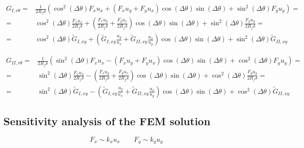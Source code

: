 \documentclass[a4paper]{jpconf}
\begin{document}
\begin{equation}
\begin{split}
G_{I,r\theta} =&\frac{1}{2R_{f}\delta}\left(\cos^{2}\left(\Delta\theta\right) F_{x}u_{x}+\left(F_{x}u_{y}+F_{y}u_{x}\right)\cos\left(\Delta\theta\right)\sin\left(\Delta\theta\right)+\sin^{2}\left(\Delta\theta\right)F_{y}u_{y}\right)=\\
=&\cos^{2}\left(\Delta\theta\right)\frac{ F_{x}u_{x}}{2R_{f}\delta}+\left(\frac{F_{x}u_{y}}{2R_{f}\delta}+\frac{F_{y}u_{x}}{2R_{f}\delta}\right)\cos\left(\Delta\theta\right)\sin\left(\Delta\theta\right)+\sin^{2}\left(\Delta\theta\right)\frac{F_{y}u_{y}}{2R_{f}\delta}=\\
=&\cos^{2}\left(\Delta\theta\right)\widetilde{G}_{I,xy}+\left(\widetilde{G}_{I,xy}\frac{u_{y}}{u_{x}}+\widetilde{G}_{II,xy}\frac{u_{x}}{u_{y}}\right)\cos\left(\Delta\theta\right)\sin\left(\Delta\theta\right)+\sin^{2}\left(\Delta\theta\right)\widetilde{G}_{II,xy}
\end{split}
\end{equation}

\begin{equation}
\begin{split}
G_{II,r\theta} =&\frac{1}{2R_{f}\delta}\left(\sin^{2}\left(\Delta\theta\right) F_{x}u_{x}-\left(F_{x}u_{y}+F_{y}u_{x}\right)\cos\left(\Delta\theta\right)\sin\left(\Delta\theta\right)+\cos^{2}\left(\Delta\theta\right)F_{y}u_{y}\right)=\\
=&\sin^{2}\left(\Delta\theta\right)\frac{ F_{x}u_{x}}{2R_{f}\delta}-\left(\frac{F_{x}u_{y}}{2R_{f}\delta}+\frac{F_{y}u_{x}}{2R_{f}\delta}\right)\cos\left(\Delta\theta\right)\sin\left(\Delta\theta\right)+\cos^{2}\left(\Delta\theta\right)\frac{F_{y}u_{y}}{2R_{f}\delta}=\\
=&\sin^{2}\left(\Delta\theta\right)\widetilde{G}_{I,xy}-\left(\widetilde{G}_{I,xy}\frac{u_{y}}{u_{x}}+\widetilde{G}_{II,xy}\frac{u_{x}}{u_{y}}\right)\cos\left(\Delta\theta\right)\sin\left(\Delta\theta\right)+\cos^{2}\left(\Delta\theta\right)\widetilde{G}_{II,xy}
\end{split}
\end{equation}

\subsection{Sensitivity analysis of the FEM solution}

\begin{equation}
F_{x}\sim k_{x}u_{x}\qquad F_{y}\sim k_{y}u_{y}
\end{equation}
\end{document}
